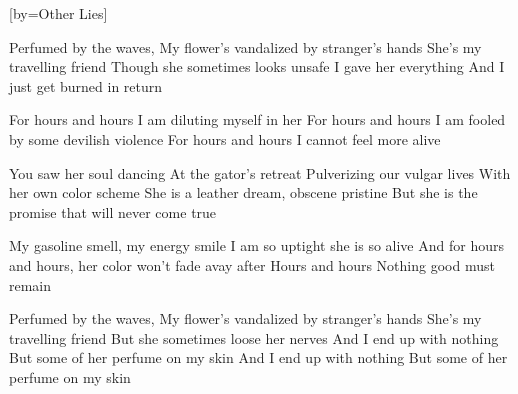 [by={Other Lies}]


  \chordsoff
  \beginverse
  Perfumed by the waves,
  My flower's vandalized by stranger's hands
  She's my travelling friend
  Though she sometimes looks unsafe
  I gave her everything
  And I just get burned in return
  \endverse
  
  \beginchorus
  For hours and hours I am diluting myself in her
  For hours and hours I am fooled by some devilish violence
  For hours and hours I cannot feel more alive
  \endchorus
  
  \beginverse
  You saw her soul dancing
  At the gator's retreat
  Pulverizing our vulgar lives
  With her own color scheme
  She is a leather dream, obscene pristine
  But she is the promise that will never come true
  \endverse
  
  \beginchorus
  My gasoline smell, my energy smile
  I am so uptight she is so alive
  And for hours and hours, her color won't fade avay after
  Hours and hours
  Nothing good must remain
  \endchorus


  \beginverse
  Perfumed by the waves,
  My flower's vandalized by stranger's hands
  She's my travelling friend
  But she sometimes loose her nerves
  And I end up with nothing
  But some of her perfume on my skin
  And I end up with nothing
  But some of her perfume on my skin
  \endverse
\endsong
